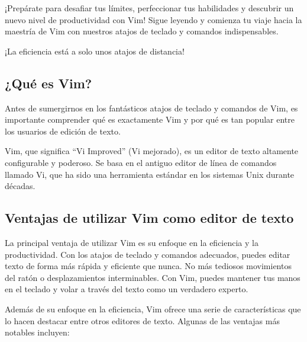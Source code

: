 \documentclass[
  doc,
  floatsintext,
  longtable,
  a4paper,
  nolmodern,
  notxfonts,
  notimes,
  colorlinks=true,linkcolor=blue,citecolor=blue,urlcolor=blue]{apa7}
\begin{document}
¡Prepárate para desafiar tus límites, perfeccionar tus habilidades y
descubrir un nuevo nivel de productividad con Vim! Sigue leyendo y
comienza tu viaje hacia la maestría de Vim con nuestros atajos de
teclado y comandos indispensables.

¡La eficiencia está a solo unos atajos de distancia!

\subsection{¿Qué es Vim?}\label{quuxe9-es-vim}

Antes de sumergirnos en los fantásticos atajos de teclado y comandos de
Vim, es importante comprender qué es exactamente Vim y por qué es tan
popular entre los usuarios de edición de texto.

Vim, que significa ``Vi Improved'' (Vi mejorado), es un editor de texto
altamente configurable y poderoso. Se basa en el antiguo editor de línea
de comandos llamado Vi, que ha sido una herramienta estándar en los
sistemas Unix durante décadas.

\subsection{Ventajas de utilizar Vim como editor de
texto}\label{ventajas-de-utilizar-vim-como-editor-de-texto}

La principal ventaja de utilizar Vim es su enfoque en la eficiencia y la
productividad. Con los atajos de teclado y comandos adecuados, puedes
editar texto de forma más rápida y eficiente que nunca. No más tediosos
movimientos del ratón o desplazamientos interminables. Con Vim, puedes
mantener tus manos en el teclado y volar a través del texto como un
verdadero experto.

Además de su enfoque en la eficiencia, Vim ofrece una serie de
características que lo hacen destacar entre otros editores de texto.
Algunas de las ventajas más notables incluyen:
\end{document}
